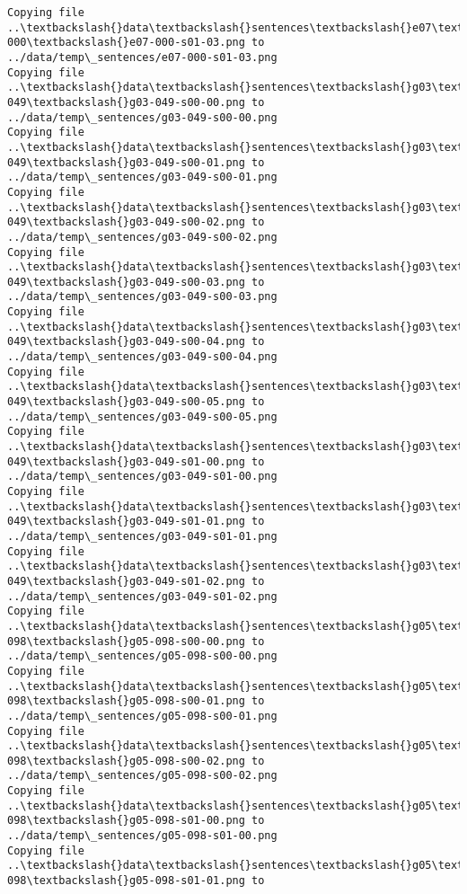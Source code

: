 \documentclass[11pt]{article}
\begin{document}
\begin{Verbatim}[commandchars=\\\{\}]
Copying file ..\textbackslash{}data\textbackslash{}sentences\textbackslash{}e07\textbackslash{}e07-000\textbackslash{}e07-000-s01-03.png to
../data/temp\_sentences/e07-000-s01-03.png
Copying file ..\textbackslash{}data\textbackslash{}sentences\textbackslash{}g03\textbackslash{}g03-049\textbackslash{}g03-049-s00-00.png to
../data/temp\_sentences/g03-049-s00-00.png
Copying file ..\textbackslash{}data\textbackslash{}sentences\textbackslash{}g03\textbackslash{}g03-049\textbackslash{}g03-049-s00-01.png to
../data/temp\_sentences/g03-049-s00-01.png
Copying file ..\textbackslash{}data\textbackslash{}sentences\textbackslash{}g03\textbackslash{}g03-049\textbackslash{}g03-049-s00-02.png to
../data/temp\_sentences/g03-049-s00-02.png
Copying file ..\textbackslash{}data\textbackslash{}sentences\textbackslash{}g03\textbackslash{}g03-049\textbackslash{}g03-049-s00-03.png to
../data/temp\_sentences/g03-049-s00-03.png
Copying file ..\textbackslash{}data\textbackslash{}sentences\textbackslash{}g03\textbackslash{}g03-049\textbackslash{}g03-049-s00-04.png to
../data/temp\_sentences/g03-049-s00-04.png
Copying file ..\textbackslash{}data\textbackslash{}sentences\textbackslash{}g03\textbackslash{}g03-049\textbackslash{}g03-049-s00-05.png to
../data/temp\_sentences/g03-049-s00-05.png
Copying file ..\textbackslash{}data\textbackslash{}sentences\textbackslash{}g03\textbackslash{}g03-049\textbackslash{}g03-049-s01-00.png to
../data/temp\_sentences/g03-049-s01-00.png
Copying file ..\textbackslash{}data\textbackslash{}sentences\textbackslash{}g03\textbackslash{}g03-049\textbackslash{}g03-049-s01-01.png to
../data/temp\_sentences/g03-049-s01-01.png
Copying file ..\textbackslash{}data\textbackslash{}sentences\textbackslash{}g03\textbackslash{}g03-049\textbackslash{}g03-049-s01-02.png to
../data/temp\_sentences/g03-049-s01-02.png
Copying file ..\textbackslash{}data\textbackslash{}sentences\textbackslash{}g05\textbackslash{}g05-098\textbackslash{}g05-098-s00-00.png to
../data/temp\_sentences/g05-098-s00-00.png
Copying file ..\textbackslash{}data\textbackslash{}sentences\textbackslash{}g05\textbackslash{}g05-098\textbackslash{}g05-098-s00-01.png to
../data/temp\_sentences/g05-098-s00-01.png
Copying file ..\textbackslash{}data\textbackslash{}sentences\textbackslash{}g05\textbackslash{}g05-098\textbackslash{}g05-098-s00-02.png to
../data/temp\_sentences/g05-098-s00-02.png
Copying file ..\textbackslash{}data\textbackslash{}sentences\textbackslash{}g05\textbackslash{}g05-098\textbackslash{}g05-098-s01-00.png to
../data/temp\_sentences/g05-098-s01-00.png
Copying file ..\textbackslash{}data\textbackslash{}sentences\textbackslash{}g05\textbackslash{}g05-098\textbackslash{}g05-098-s01-01.png to

\end{Verbatim}
\end{document}
